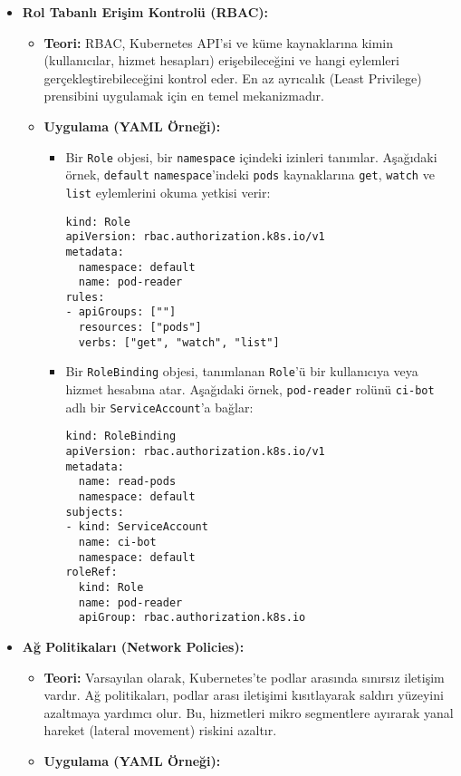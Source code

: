 \begin{itemize}
    \item \textbf{Rol Tabanlı Erişim Kontrolü (RBAC):}
    \begin{itemize}
        \item \textbf{Teori:} RBAC, Kubernetes API'si ve küme kaynaklarına kimin (kullanıcılar, hizmet hesapları) erişebileceğini ve hangi eylemleri gerçekleştirebileceğini kontrol eder. En az ayrıcalık (Least Privilege) prensibini uygulamak için en temel mekanizmadır.
        \item \textbf{Uygulama (YAML Örneği):}
            \begin{itemize}
                \item Bir \texttt{Role} objesi, bir \texttt{namespace} içindeki izinleri tanımlar. Aşağıdaki örnek, \texttt{default} \texttt{namespace}'indeki \texttt{pods} kaynaklarına \texttt{get}, \texttt{watch} ve \texttt{list} eylemlerini okuma yetkisi verir:
\begin{verbatim}
kind: Role
apiVersion: rbac.authorization.k8s.io/v1
metadata:
  namespace: default
  name: pod-reader
rules:
- apiGroups: [""]
  resources: ["pods"]
  verbs: ["get", "watch", "list"]
\end{verbatim}
                \item Bir \texttt{RoleBinding} objesi, tanımlanan \texttt{Role}'ü bir kullanıcıya veya hizmet hesabına atar. Aşağıdaki örnek, \texttt{pod-reader} rolünü \texttt{ci-bot} adlı bir \texttt{ServiceAccount}'a bağlar:
\begin{verbatim}
kind: RoleBinding
apiVersion: rbac.authorization.k8s.io/v1
metadata:
  name: read-pods
  namespace: default
subjects:
- kind: ServiceAccount
  name: ci-bot
  namespace: default
roleRef:
  kind: Role
  name: pod-reader
  apiGroup: rbac.authorization.k8s.io
\end{verbatim}
            \end{itemize}
    \end{itemize}
    \item \textbf{Ağ Politikaları (Network Policies):}
    \begin{itemize}
        \item \textbf{Teori:} Varsayılan olarak, Kubernetes'te podlar arasında sınırsız iletişim vardır. Ağ politikaları, podlar arası iletişimi kısıtlayarak saldırı yüzeyini azaltmaya yardımcı olur. Bu, hizmetleri mikro segmentlere ayırarak yanal hareket (lateral movement) riskini azaltır.
        \item \textbf{Uygulama (YAML Örneği):}

\end{itemize}
\end{itemize}
